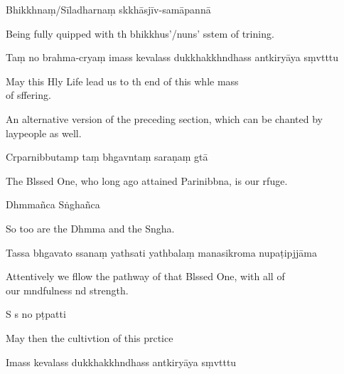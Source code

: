 Bhikkhnaṃ/Sīladharnaṃ skkhāsjīv-samāpannā

\begin{english}
  Being fully quipped with th bhikkhus'/nuns' sstem of trining.
\end{english}

Taṃ no brahma-cryaṃ imass kevalass dukkhakkhndhass antkiryāya sṃvtttu

\begin{english}
  May this Hly Life lead us to th end of this whle mass \\of sffering.
\end{english}

\clearpage

\begin{instruction}
  An alternative version of the preceding section, which can be chanted by laypeople as well.
\end{instruction}

Crparnibbutamp taṃ bhgavntaṃ saraṇaṃ gtā

\begin{english}
  The Blssed One, who long ago attained Parinibbna, is our rfuge.
\end{english}

Dhmmañca Sṅghañca

\begin{english}
  So too are the Dhmma and the Sngha.
\end{english}

Tassa bhgavato ssanaṃ yathsati yathbalaṃ manasikroma nupaṭipjjāma

\begin{english}
  Attentively we fllow the pathway of that Blssed One, with all of \\our mndfulness nd strength.
\end{english}

S s no pṭpatti

\begin{english}
  May then the cultivtion of this prctice
\end{english}

Imass kevalass dukkhakkhndhass antkiryāya sṃvtttu

